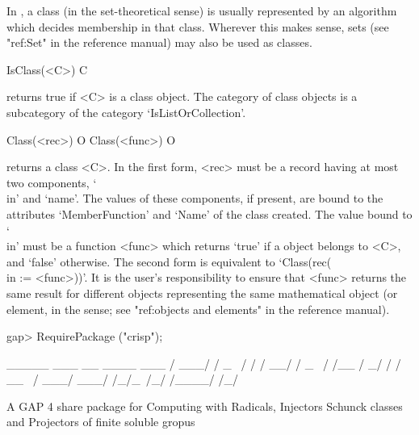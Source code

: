 
In {\CRISP}, a class (in the set-theoretical sense) is usually represented
by an algorithm which decides membership in that class. Wherever this makes
sense, sets (see "ref:Set" in the {\GAP} reference
manual) may also be used as classes.



\>IsClass(<C>) C

returns true if <C> is a class object. The category of class objects is a
subcategory of the category `IsListOrCollection'.

\>Class(<rec>) O
\>Class(<func>) O

returns a class <C>. In the first form, <rec> must be a record having at most
two components, `\\in' and `name'. The values of these components, if
present, are bound to the attributes `MemberFunction' and `Name' of the
class created. The value bound to `\\in' must be a function <func> which
returns `true' if a {\GAP} object belongs to <C>, and `false' otherwise. The
second form is equivalent to `Class(rec(\\in := <func>))'. It is the user's
responsibility to ensure that <func> returns the same result for different
{\GAP} objects representing the same mathematical object (or element, in the
{\GAP} sense; see "ref:objects and elements" in the {\GAP} reference manual).

\beginexample
gap> RequirePackage ("crisp");
                                                    
              _____  ___    __  ____   ___        
             / ___/ / _ \  / / / __/  / _ \       
            / /__  /   _/ / / _\_ \  / ___/       
            \___/ /_/\_\ /_/ /____/ /_/           

              A GAP 4 share package for           
          Computing with Radicals, Injectors        
            Schunck classes and Projectors          
               of finite soluble gropus             
                                                    
